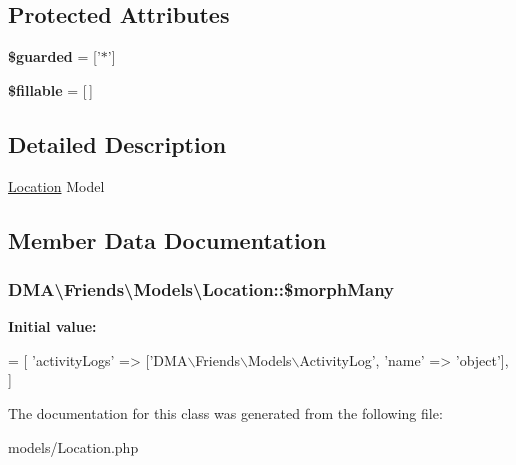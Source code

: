 \subsection*{Protected Attributes}
\begin{DoxyCompactItemize}
\item 
\hypertarget{classDMA_1_1Friends_1_1Models_1_1Location_a248021f938f61b3ccce7e20b259e39e9}{{\bfseries \$guarded} = \mbox{[}'$\ast$'\mbox{]}}\label{classDMA_1_1Friends_1_1Models_1_1Location_a248021f938f61b3ccce7e20b259e39e9}

\item 
\hypertarget{classDMA_1_1Friends_1_1Models_1_1Location_aaa75ba74c2a24c4e42b109b0b2c82ca0}{{\bfseries \$fillable} = \mbox{[}$\,$\mbox{]}}\label{classDMA_1_1Friends_1_1Models_1_1Location_aaa75ba74c2a24c4e42b109b0b2c82ca0}

\end{DoxyCompactItemize}


\subsection{Detailed Description}
\hyperlink{classDMA_1_1Friends_1_1Models_1_1Location}{Location} Model 

\subsection{Member Data Documentation}
\hypertarget{classDMA_1_1Friends_1_1Models_1_1Location_a94915d02afa4db52780159b84d9ce12e}{
\subsubsection[{\$morph\-Many}]{\setlength{\rightskip}{0pt plus 5cm}D\-M\-A\textbackslash{}\-Friends\textbackslash{}\-Models\textbackslash{}\-Location\-::\$morph\-Many}}\label{classDMA_1_1Friends_1_1Models_1_1Location_a94915d02afa4db52780159b84d9ce12e}
{\bfseries Initial value\-:}
\begin{DoxyCode}
= [ 
        \textcolor{stringliteral}{'activityLogs'}  => [\textcolor{stringliteral}{'DMA\(\backslash\)Friends\(\backslash\)Models\(\backslash\)ActivityLog'}, \textcolor{stringliteral}{'name'} => \textcolor{stringliteral}{'object'}],
    ]
\end{DoxyCode}


The documentation for this class was generated from the following file\-:\begin{DoxyCompactItemize}
\item 
models/Location.\-php\end{DoxyCompactItemize}

